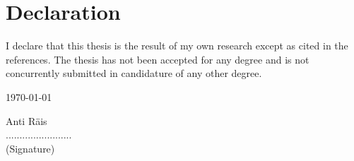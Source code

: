 \chapter*{Declaration}
\label{declaration}
\thispagestyle{empty}

\vspace{30mm}
I declare that this thesis is the result of my own research except as cited in the references.
The thesis has not been accepted for any degree and is not concurrently submitted in candidature
of any other degree.
\vspace{30mm}

\begin{minipage}{0.50\textwidth}
    \begin{flushleft}\today\end{flushleft}
\end{minipage}
\begin{minipage}{0.44\textwidth}
    \begin{flushright}
    Anti Räis \\
    \vspace{0.5cm}
    ........................ \\
    (Signature)
    \end{flushright}
\end{minipage}
